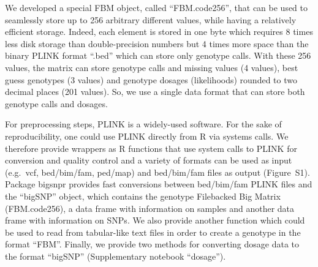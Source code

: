 \documentclass{bioinfo}
\begin{document}
\begin{methods}
We developed a special FBM object, called ``FBM.code256'', that can be used to seamlessly store up to 256 arbitrary different values, while having a relatively efficient storage. Indeed, each element is stored in one byte which requires 8 times less disk storage than double-precision numbers but 4 times more space than the binary PLINK format ``.bed'' which can store only genotype calls. With these 256 values, the matrix can store genotype calls and missing values (4 values), best guess genotypes (3 values) and genotype dosages (likelihoods) rounded to two decimal places (201 values). So, we use a single data format that can store both genotype calls and dosages.

For preprocessing steps, PLINK is a widely-used software. For the sake of reproducibility, one could use PLINK directly from R via systems calls. We therefore provide wrappers as R functions that use system calls to PLINK for conversion and quality control and a variety of formats can be used as input (e.g.\ vcf, bed/bim/fam, ped/map) and bed/bim/fam files as output (Figure~S1).
Package bigsnpr provides fast conversions between bed/bim/fam PLINK files and the ``bigSNP'' object, which contains the genotype Filebacked Big Matrix (FBM.code256), a data frame with information on samples and another data frame with information on SNPs. We also provide another function which could be used to read from tabular-like text files in order to create a genotype in the format ``FBM''. Finally, we provide two methods for converting dosage data to the format ``bigSNP'' (Supplementary notebook ``dosage'').


\end{methods}
\end{document}
